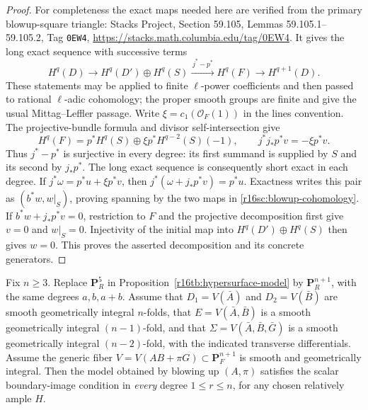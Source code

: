 \begin{proof}
For completeness the exact maps needed here are verified from
the primary blowup-square triangle: Stacks Project,
Section 59.105, Lemmas 59.105.1--59.105.2, Tag \texttt{0EW4},
\url{https://stacks.math.columbia.edu/tag/0EW4}.
It gives the long exact sequence with successive terms
\[
 H^q(D)\longrightarrow H^q(D')\oplus H^q(S)
       \xrightarrow{\,j^*-p^*\,}H^q(F)
                   \longrightarrow H^{q+1}(D).
\]
These statements may be applied to finite $\ell$-power coefficients
and then passed to rational $\ell$-adic cohomology; the proper
smooth groups are finite and give the usual Mittag--Leffler passage.
Write $\xi=c_1(\mathcal O_F(1))$ in the lines convention.
The projective-bundle formula and divisor self-intersection give
\[
 H^q(F)=p^*H^q(S)\oplus\xi p^*H^{q-2}(S)(-1),
                    \qquad j^*j_*p^*v=-\xi p^*v.
\]
Thus $j^*-p^*$ is surjective in every degree: its first
summand is supplied by $S$ and its second by $j_*p^*$.
The long exact sequence is consequently short exact in each degree.
If $j^*\omega=p^*u+\xi p^*v$, then
$j^*(\omega+j_*p^*v)=p^*u$. Exactness writes this pair as
$(b^*w,w|_S)$, proving spanning by the two maps in
\eqref{r16sc:blowup-cohomology}.
If $b^*w+j_*p^*v=0$, restriction to $F$ and the projective
decomposition first give $v=0$ and $w|_S=0$. Injectivity of
the initial map into $H^q(D')\oplus H^q(S)$ then gives $w=0$.
This proves the asserted decomposition and its concrete generators.
\end{proof}

\begin{proposition}
\label{r16sc:hypersurface-images}
Fix $n\geq3$. Replace $\mathbf P^5_R$ in
Proposition~\ref{r16tb:hypersurface-model} by
$\mathbf P^{n+1}_R$, with the same degrees $a,b,a+b$.
Assume that $D_1=V(\bar A)$ and $D_2=V(\bar B)$ are smooth
geometrically integral $n$-folds, that
$E=V(\bar A,\bar B)$ is a smooth geometrically integral
$(n-1)$-fold, and that
$\Sigma=V(\bar A,\bar B,\bar G)$ is a smooth geometrically
integral $(n-2)$-fold, with the indicated transverse differentials.
Assume the generic fiber
$V=V(AB+\pi G)\subset\mathbf P^{n+1}_{F}$ is smooth and
geometrically integral.
Then the model obtained by blowing up $(A,\pi)$ satisfies
the scalar boundary-image condition in \emph{every} degree
$1\leq r\leq n$, for any chosen relatively ample $H$.
\end{proposition}

